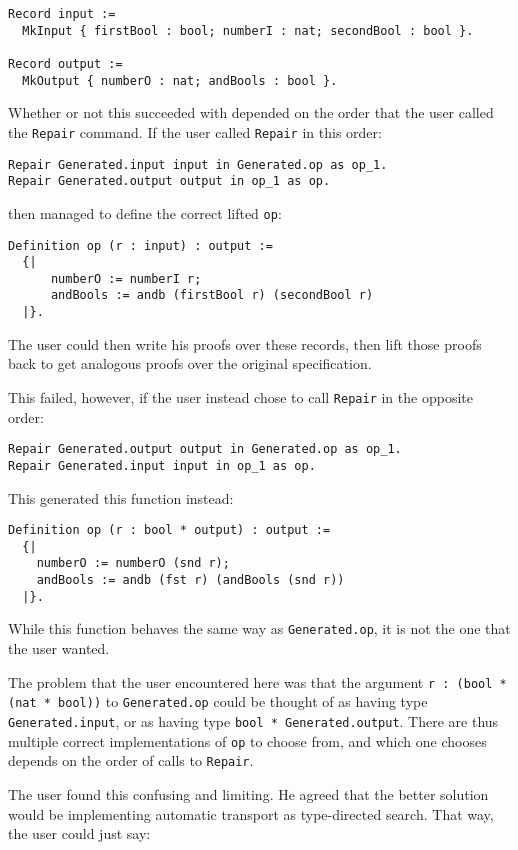 \begin{lstlisting}
Record input :=
  MkInput { firstBool : bool; numberI : nat; secondBool : bool }.

Record output :=
  MkOutput { numberO : nat; andBools : bool }.
\end{lstlisting}
Whether or not this succeeded with \toolname depended on the order that the user
called the \lstinline{Repair} command.
If the user called \lstinline{Repair} in this order:

\begin{lstlisting}
Repair Generated.input input in Generated.op as op_1.
Repair Generated.output output in op_1 as op.
\end{lstlisting}
then \toolname managed to define the correct lifted \lstinline{op}:

\begin{lstlisting}
Definition op (r : input) : output :=
  {|
      numberO := numberI r;
      andBools := andb (firstBool r) (secondBool r)
  |}.
\end{lstlisting}
The user could then write his proofs over these records,
then lift those proofs back to get analogous proofs over the original specification.

This failed, however, if the user instead chose to call \lstinline{Repair} in the opposite order:

\begin{lstlisting}
Repair Generated.output output in Generated.op as op_1.
Repair Generated.input input in op_1 as op.
\end{lstlisting}
This generated this function instead:

\begin{lstlisting}
Definition op (r : bool * output) : output := 
  {|
    numberO := numberO (snd r);
    andBools := andb (fst r) (andBools (snd r))
  |}.
\end{lstlisting}
While this function behaves the same way as \lstinline{Generated.op}, it is not the one that the user wanted.

The problem that the user encountered here was that the argument \lstinline{r : (bool * (nat * bool))} to
\lstinline{Generated.op} could be thought of as having type \lstinline{Generated.input}, or as having type
\lstinline{bool * Generated.output}.
There are thus multiple correct implementations of \lstinline{op} to choose from,
and which one \toolname chooses depends on the order of calls to \lstinline{Repair}.

The user found this confusing and limiting.
He agreed that the better solution would be implementing automatic transport as type-directed search.
That way, the user could just say:


